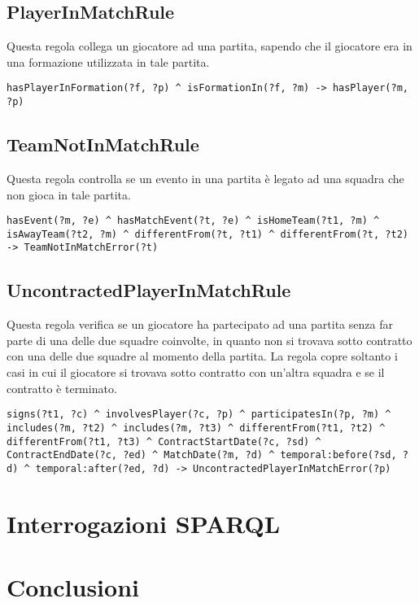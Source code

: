 \documentclass[11pt]{report} %
\begin{document}
\section{PlayerInMatchRule}

Questa regola collega un giocatore ad una partita, sapendo che il giocatore era in una formazione utilizzata in tale partita.

\begin{lstlisting}[language=SWRL]
hasPlayerInFormation(?f, ?p) ^ isFormationIn(?f, ?m) -> hasPlayer(?m, ?p)
\end{lstlisting}

\section{TeamNotInMatchRule}

Questa regola controlla se un evento in una partita è legato ad una squadra che non gioca in tale partita.

\begin{lstlisting}[language=SWRL]
hasEvent(?m, ?e) ^ hasMatchEvent(?t, ?e) ^ isHomeTeam(?t1, ?m) ^ isAwayTeam(?t2, ?m) ^ differentFrom(?t, ?t1) ^ differentFrom(?t, ?t2) -> TeamNotInMatchError(?t)
\end{lstlisting}

\newpage

\section{UncontractedPlayerInMatchRule}

Questa regola verifica se un giocatore ha partecipato ad una partita senza far parte di una delle due squadre coinvolte, in quanto non si trovava sotto contratto con una delle due squadre al momento della partita.
La regola copre soltanto i casi in cui il giocatore si trovava sotto contratto con un'altra squadra e se il contratto è terminato.

\begin{lstlisting}[language=SWRL]
signs(?t1, ?c) ^ involvesPlayer(?c, ?p) ^ participatesIn(?p, ?m) ^ includes(?m, ?t2) ^ includes(?m, ?t3) ^ differentFrom(?t1, ?t2) ^ differentFrom(?t1, ?t3) ^ ContractStartDate(?c, ?sd) ^ ContractEndDate(?c, ?ed) ^ MatchDate(?m, ?d) ^ temporal:before(?sd, ?d) ^ temporal:after(?ed, ?d) -> UncontractedPlayerInMatchError(?p)
\end{lstlisting}


\chapter{Interrogazioni SPARQL}

\chapter{Conclusioni}

\medspace

\printbibliography
\end{document}
